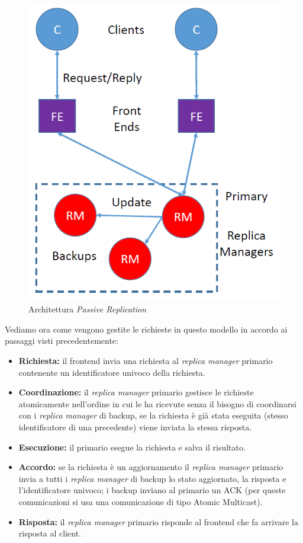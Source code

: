 \documentclass{article}
\begin{document}
\begin{figure}[H]
\centering
\includegraphics[scale=0.5]{img/PassiveBackup.PNG}
\caption{Architettura \textit{Passive Replication}}
\end{figure}

Vediamo ora come vengono gestite le richieste in questo modello in accordo ai passaggi visti precedentemente:
\begin{itemize}
    \item \textbf{Richiesta:} il frontend invia una richiesta al \textit{replica manager} primario contenente un identificatore univoco della richiesta.
    \item \textbf{Coordinazione:} il \textit{replica manager} primario gestisce le richieste atomicamente nell'ordine in cui le ha ricevute senza il bisogno di coordinarsi con i \textit{replica manager} di backup, se la richiesta è già stata eseguita (stesso identificatore di una precedente) viene inviata la stessa risposta.
    \item \textbf{Esecuzione:} il primario esegue la richiesta e salva il risultato.
    \item \textbf{Accordo:} se la richiesta è un aggiornamento il \textit{replica manager} primario invia a tutti i \textit{replica manager} di backup lo stato aggiornato, la risposta e l'identificatore univoco; i backup inviano al primario un ACK (per queste comunicazioni si usa una comunicazione di tipo Atomic Multicast).
    \item \textbf{Risposta:} il \textit{replica manager} primario risponde al frontend che fa arrivare la risposta al client.
\end{itemize}
\end{document}
